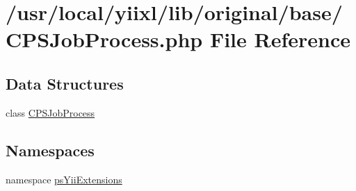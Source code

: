 \hypertarget{CPSJobProcess_8php}{
\section{/usr/local/yiixl/lib/original/base/CPSJobProcess.php File Reference}
\label{CPSJobProcess_8php}
}
\subsection*{Data Structures}
\begin{DoxyCompactItemize}
\item 
class \hyperlink{classCPSJobProcess}{CPSJobProcess}
\end{DoxyCompactItemize}
\subsection*{Namespaces}
\begin{DoxyCompactItemize}
\item 
namespace \hyperlink{namespacepsYiiExtensions}{psYiiExtensions}
\end{DoxyCompactItemize}
